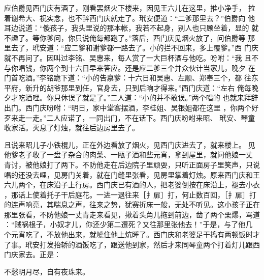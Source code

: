 应伯爵见西门庆有酒了，刚看罢烟火下楼来，因见王六儿在这里，推小净手，
拉着谢希大、祝实念，也不辞西门庆就走了。玳安便道：“二爹那里去？”伯爵向
他耳边说道：“傻孩子，我头里说的那本帐，我若不起身，别人也只顾坐着，显的
就不趣了。等你爹问，你只说俺每都跑了。”落后，西门庆见烟火放了，问伯爵等
那里去了，玳安道：“应二爹和谢爹都一路去了。小的拦不回来，多上覆爹。”西
门庆就不再问了。因叫过李铭、吴惠来，每人赏了一大巨杯酒与他吃。吩咐：“我
且不与你唱钱，你两个到十六日早来答应。还是应二爹三个并众伙计当家儿，晚夕
在门首吃酒。”李铭跪下道：“小的告禀爹：十六日和吴惠、左顺、郑奉三个，都
往东平府，新升的胡爷那里到任，官身去，只到后晌才得来。”西门庆道：“左右
俺每晚夕才吃酒哩。你只休误了就是了。”二人道：“小的并不敢误。”两个唱的
也就来拜辞出门。西门庆吩咐：“明日，家中堂客摆酒，李桂姐、吴银姐都在这里
，你两个好歹来走一走。”二人应诺了，一同出门，不在话下。西门庆吩咐来昭、
玳安、琴童收家活。灭息了灯烛，就往后边房里去了。

且说来昭儿子小铁棍儿，正在外边看放了烟火，见西门庆进去了，就来楼上。
见他爹老子收了一盘子杂合的肉菜、一瓯子酒和些元宵，拿到屋里，就问他娘一丈
青讨，被他娘打了两下。不防他走在后边院子里顽耍，只听正面房子里笑声，只说
唱的还没去哩，见房门关着，就在门缝里张看，见房里掌着灯烛。原来西门庆和王
六儿两个，在床沿子上行房。西门庆已有酒的人，把老婆倒按在床沿上，褪去小衣
，那话上使着托子干后庭花。一进一退往来［扌扉］打，何止数百回，［扌扉］打
的连声响亮，其喘息之声，往来之势，犹赛折床一般，无处不听见。这小孩子正在
那里张看，不防他娘一丈青走来看见，揪着头角儿拖到前边，凿了两个栗爆，骂道
：“贼祸根子，小奴才儿，你还少第二遭死？又往那里张他去！”于是，与了他几
个元宵吃了，不放他出来，就唬住他上炕睡了。西门庆和老婆足干捣有两顿饭时才
了事。玳安打发抬轿的酒饭吃了，跟送他到家，然后才来同琴童两个打着灯儿跟西
门庆家去。正是：

不愁明月尽，自有夜珠来。